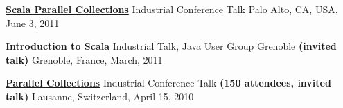 \documentclass[9pt]{article}
\begin{document}
\begin{easylist}[itemize]
\noindent
\href{http://days2011.scala-lang.org/node/138/272/29.%20Parallel%20Collections.mp4}
{\bf Scala Parallel Collections}
\vspace{-0.03in}
\newline\noindent Industrial Conference Talk
\dates{}
\linebreak\noindent Palo Alto, CA, USA, June 3, 2011
\bigskip

\noindent
\href{http://www.slideshare.net/AleksandarProkopec/introduction-to-scala-39540464}
{\bf Introduction to Scala}
\vspace{-0.03in}
\newline\noindent Industrial Talk, Java User Group Grenoble \textbf{(invited talk)}
\dates{}
\linebreak\noindent Grenoble, France, March, 2011
\bigskip

\noindent\href{http://days2010.scala-lang.org/node/138/140/}
{\bf Parallel Collections}
\vspace{-0.03in}
\newline\noindent Industrial Conference Talk \textbf{(150 attendees, invited talk)}
\dates{}
\linebreak\noindent Lausanne, Switzerland, April 15, 2010
\bigskip



\bigskip






\end{easylist}
\end{document}
